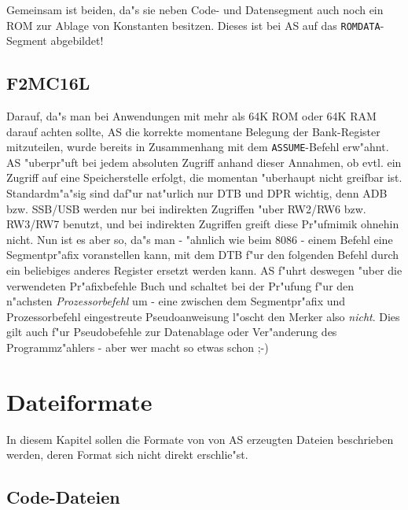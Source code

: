 \documentclass[12pt,a4paper,twoside]{report}
\newcommand{\tty}[1]{{\tt #1}}
\begin{document}
{Gemeinsam ist beiden, da"s sie neben Code- und Datensegment auch noch ein
ROM zur Ablage von Konstanten besitzen.  Dieses ist bei AS auf das
\tty{ROMDATA}-Segment abgebildet!


\section{F2MC16L}

Darauf, da"s man bei Anwendungen mit mehr als 64K ROM oder 64K RAM darauf
achten sollte, AS die korrekte momentane Belegung der Bank-Register
mitzuteilen, wurde bereits in Zusammenhang mit dem {\tt ASSUME}-Befehl
erw"ahnt.  AS "uberpr"uft bei jedem absoluten Zugriff anhand dieser
Annahmen, ob evtl. ein Zugriff auf eine Speicherstelle erfolgt, die
momentan "uberhaupt nicht greifbar ist.  Standardm"a"sig sind daf"ur
nat"urlich nur DTB und DPR wichtig, denn ADB bzw. SSB/USB werden nur bei
indirekten Zugriffen "uber RW2/RW6 bzw. RW3/RW7 benutzt, und bei
indirekten Zugriffen greift diese Pr"ufmimik ohnehin nicht.  Nun ist es
aber so, da"s man - "ahnlich wie beim 8086 - einem Befehl eine
Segmentpr"afix voranstellen kann, mit dem DTB f"ur den folgenden Befehl
durch ein beliebiges anderes Register ersetzt werden kann.  AS f"uhrt
deswegen "uber die verwendeten Pr"afixbefehle Buch und schaltet bei der
Pr"ufung f"ur den n"achsten {\em Prozessorbefehl} um - eine zwischen dem
Segmentpr"afix und Prozessorbefehl eingestreute Pseudoanweisung l"oscht
den Merker also {\em nicht}.  Dies gilt auch f"ur Pseudobefehle zur
Datenablage oder Ver"anderung des Programmz"ahlers - aber wer macht so
etwas schon ;-)


\cleardoublepage
\chapter{Dateiformate}

In diesem Kapitel sollen die Formate von von AS erzeugten Dateien
beschrieben werden, deren Format sich nicht direkt erschlie"st.

\section{Code-Dateien}
\label{SectCodeFormat}

}
\end{document}
